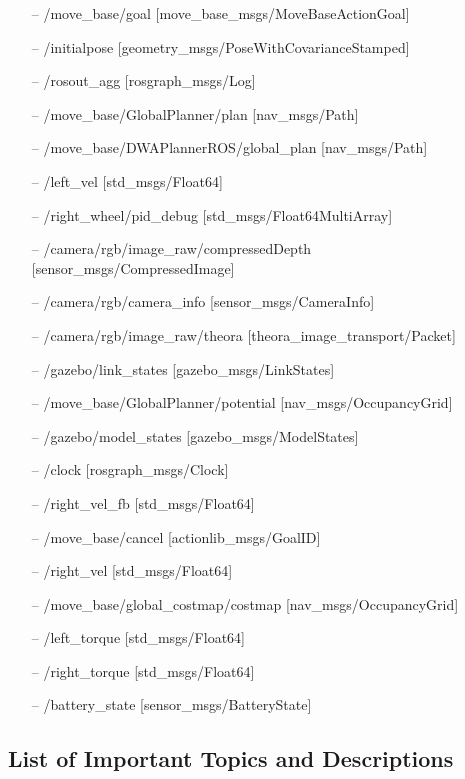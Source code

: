 \documentclass[12]{article}
\begin{document}
\begin{itemize}
\item[--] /move\_base/goal [move\_base\_msgs/MoveBaseActionGoal]
\item[--] /initialpose [geometry\_msgs/PoseWithCovarianceStamped]
\item[--] /rosout\_agg [rosgraph\_msgs/Log]
\item[--] /move\_base/GlobalPlanner/plan [nav\_msgs/Path]
\item[--] /move\_base/DWAPlannerROS/global\_plan [nav\_msgs/Path]
\item[--] /left\_vel [std\_msgs/Float64]
\item[--] /right\_wheel/pid\_debug [std\_msgs/Float64MultiArray]
\item[--] /camera/rgb/image\_raw/compressedDepth [sensor\_msgs/CompressedImage]
\item[--] /camera/rgb/camera\_info [sensor\_msgs/CameraInfo]
\item[--] /camera/rgb/image\_raw/theora [theora\_image\_transport/Packet]
\item[--] /gazebo/link\_states [gazebo\_msgs/LinkStates]
\item[--] /move\_base/GlobalPlanner/potential [nav\_msgs/OccupancyGrid]
\item[--] /gazebo/model\_states [gazebo\_msgs/ModelStates]
\item[--] /clock [rosgraph\_msgs/Clock]
\item[--] /right\_vel\_fb [std\_msgs/Float64]
\item[--] /move\_base/cancel [actionlib\_msgs/GoalID]
\item[--] /right\_vel [std\_msgs/Float64]
\item[--] /move\_base/global\_costmap/costmap [nav\_msgs/OccupancyGrid]
\item[--] /left\_torque [std\_msgs/Float64]
\item[--] /right\_torque [std\_msgs/Float64] 
\item[--] /battery\_state [sensor\_msgs/BatteryState] 
\end{itemize} 

\subsection{List of Important Topics and Descriptions}
\end{document}
